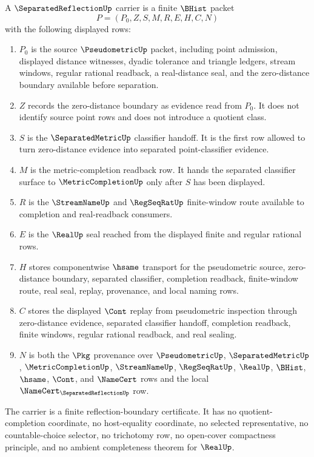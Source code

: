 \begin{definition}
\label{def:separated-reflection-carrier}
A $\SeparatedReflectionUp$ carrier is a finite $\BHist$ packet
$$
P=(P_0,Z,S,M,R,E,H,C,N)
$$
with the following displayed rows:
\begin{enumerate}
\item $P_0$ is the source $\PseudometricUp$ packet, including point admission, displayed distance witnesses, dyadic tolerance and triangle ledgers, stream windows, regular rational readback, a real-distance seal, and the zero-distance boundary available before separation.
\item $Z$ records the zero-distance boundary as evidence read from $P_0$. It does not identify source point rows and does not introduce a quotient class.
\item $S$ is the $\SeparatedMetricUp$ classifier handoff. It is the first row allowed to turn zero-distance evidence into separated point-classifier evidence.
\item $M$ is the metric-completion readback row. It hands the separated classifier surface to $\MetricCompletionUp$ only after $S$ has been displayed.
\item $R$ is the $\StreamNameUp$ and $\RegSeqRatUp$ finite-window route available to completion and real-readback consumers.
\item $E$ is the $\RealUp$ seal reached from the displayed finite and regular rational rows.
\item $H$ stores componentwise $\hsame$ transport for the pseudometric source, zero-distance boundary, separated classifier, completion readback, finite-window route, real seal, replay, provenance, and local naming rows.
\item $C$ stores the displayed $\Cont$ replay from pseudometric inspection through zero-distance evidence, separated classifier handoff, completion readback, finite windows, regular rational readback, and real sealing.
\item $N$ is both the $\Pkg$ provenance over $\PseudometricUp$, $\SeparatedMetricUp$, $\MetricCompletionUp$, $\StreamNameUp$, $\RegSeqRatUp$, $\RealUp$, $\BHist$, $\hsame$, $\Cont$, and $\NameCert$ rows and the local $\NameCert_{\SeparatedReflectionUp}$ row.
\end{enumerate}
The carrier is a finite reflection-boundary certificate. It has no quotient-completion coordinate, no host-equality coordinate, no selected representative, no countable-choice selector, no trichotomy row, no open-cover compactness principle, and no ambient completeness theorem for $\RealUp$.
\end{definition}

